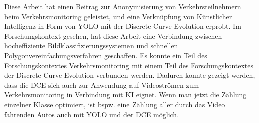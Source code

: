 {{	Diese Arbeit hat einen Beitrag zur Anonymisierung von Verkehrsteilnehmern beim Verkehrsmonitoring geleistet, und eine Verknüpfung von Künstlicher Intelligenz in Form von YOLO mit der Discrete Curve Evolution erprobt. Im Forschungskontext gesehen, hat diese Arbeit eine Verbindung zwischen hocheffiziente Bildklassifizierungssystemen und schnellen Polygonvereinfachungsverfahren geschaffen. Es konnte ein Teil des Forschungskontextes Verkehrsmonitoring mit einem Teil des Forschungskontextes der Discrete Curve Evolution verbunden werden. Dadurch konnte gezeigt werden, dass die DCE sich auch zur Anwendung auf Videoströmen zum Verkehrsmonitoring in Verbindung mit KI eignet. Wenn man jetzt  die Zählung einzelner Klasse optimiert, ist bspw. eine Zählung aller durch das Video fahrenden Autos auch mit YOLO und der DCE möglich. \\



	
	}

}




